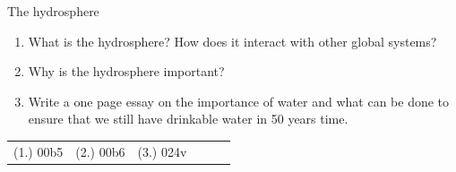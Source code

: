\pagebreak
\begin{eocexercises}{The hydrosphere}
            \nopagebreak
\label{m38138*fs-id1169173692606}\begin{enumerate}[noitemsep, label=\textbf{\arabic*}. ] 
            \item What is the hydrosphere? How does it interact with other global systems?\newline
            \item Why is the hydrosphere important?\newline
\item Write a one page essay on the importance of water and what can be done to ensure that we still have drinkable water in 50 years time.
\end{enumerate}
\practiceinfo
\par 
 \par \begin{tabular}[h]{cccccc}
 (1.) 00b5  &  (2.) 00b6  & (3.) 024v \end{tabular}
\end{eocexercises}
